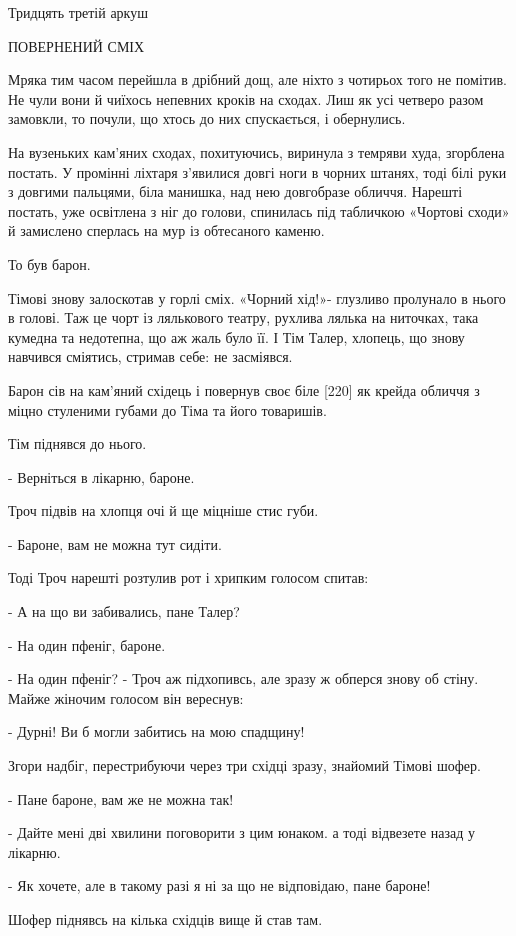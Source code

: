 Тридцять третій аркуш

ПОВЕРНЕНИЙ СМІХ

Мряка тим часом перейшла в дрібний дощ, але ніхто з чотирьох того не помітив. Не чули вони й чиїхось непевних кроків на сходах. Лиш як усі четверо разом замовкли, то почули, що хтось до них спускається, і обернулись.

На вузеньких кам'яних сходах, похитуючись, виринула з темряви худа, згорблена постать. У промінні ліхтаря з'явилися довгі ноги в чорних штанях, тоді білі руки з довгими пальцями, біла манишка, над нею довгобразе обличчя. Нарешті постать, уже освітлена з ніг до голови, спинилась під табличкою «Чортові сходи» й замислено сперлась на мур із обтесаного каменю.

То був барон.

Тімові знову залоскотав у горлі сміх. «Чорний хід!»- глузливо пролунало в нього в голові. Таж це чорт із лялькового театру, рухлива лялька на ниточках, така кумедна та недотепна, що аж жаль було її. І Тім Талер, хлопець, що знову навчився сміятись, стримав себе: не засміявся.

Барон сів на кам'яний східець і повернув своє біле [220] як крейда обличчя з міцно стуленими губами до Тіма та його товаришів.

Тім піднявся до нього.

- Верніться в лікарню, бароне.

Троч підвів на хлопця очі й ще міцніше стис губи.

- Бароне, вам не можна тут сидіти.

Тоді Троч нарешті розтулив рот і хрипким голосом спитав:

- А на що ви забивались, пане Талер?

- На один пфеніг, бароне.

- На один пфеніг? - Троч аж підхопивсь, але зразу ж обперся знову об стіну. Майже жіночим голосом він вереснув:

- Дурні! Ви б могли забитись на мою спадщину!

Згори надбіг, перестрибуючи через три східці зразу, знайомий Тімові шофер.

- Пане бароне, вам же не можна так!

- Дайте мені дві хвилини поговорити з цим юнаком. а тоді відвезете назад у лікарню.

- Як хочете, але в такому разі я ні за що не відповідаю, пане бароне!

Шофер піднявсь на кілька східців вище й став там.


